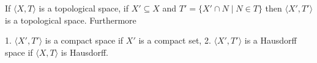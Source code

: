 If $\langle X, T \rangle$ is a topological space, if $X' \subseteq X$ and $T' = \{X' \cap N \mid N \in T\}$ then $\langle X', T' \rangle$ is a topological space. Furthermore

1. $\langle X', T' \rangle$ is a compact space if $X'$ is a compact set,
2. $\langle X', T' \rangle$ is a Hausdorff space if $\langle X, T \rangle$ is Hausdorff.
